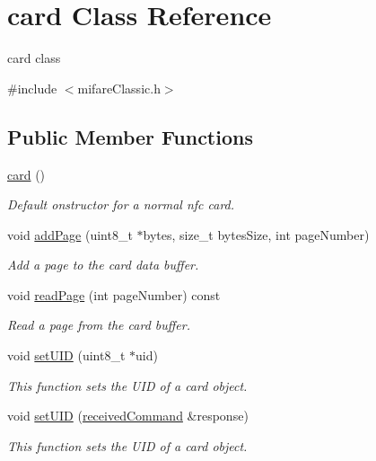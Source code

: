 \hypertarget{classcard}{}\section{card Class Reference}
\label{classcard}


card class  




{\ttfamily \#include $<$mifare\+Classic.\+h$>$}

\subsection*{Public Member Functions}
\begin{DoxyCompactItemize}
\item 
\hyperlink{classcard_a93a10f1d2e4b3af94962373b88eecd6d}{card} ()
\begin{DoxyCompactList}\small\item\em Default onstructor for a normal nfc card. \end{DoxyCompactList}\item 
void \hyperlink{classcard_acc59c0616f2cb2a275e4f3dc12cf2e68}{add\+Page} (uint8\+\_\+t $\ast$bytes, size\+\_\+t bytes\+Size, int page\+Number)
\begin{DoxyCompactList}\small\item\em Add a page to the card data buffer. \end{DoxyCompactList}\item 
void \hyperlink{classcard_a94c174b824e03f95a8c6c460fde5cc05}{read\+Page} (int page\+Number) const
\begin{DoxyCompactList}\small\item\em Read a page from the card buffer. \end{DoxyCompactList}\item 
void \hyperlink{classcard_af5b0f2fc4fe0a5c1c05bdac63580a560}{set\+U\+ID} (uint8\+\_\+t $\ast$uid)
\begin{DoxyCompactList}\small\item\em This function sets the U\+ID of a card object. \end{DoxyCompactList}\item 
void \hyperlink{classcard_aacc4d5b92c92e3e7e2304d1b9dd17ddd}{set\+U\+ID} (\hyperlink{classreceivedCommand}{received\+Command} \&response)
\begin{DoxyCompactList}\small\item\em This function sets the U\+ID of a card object. \end{DoxyCompactList}\item 

\end{DoxyCompactItemize}
